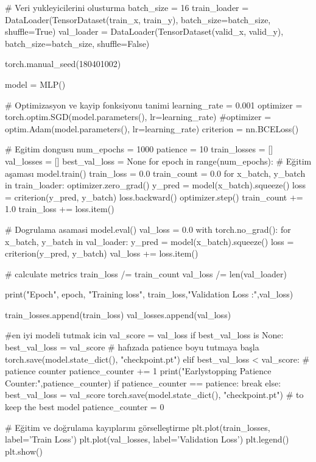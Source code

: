 \documentclass[11pt]{article}
\begin{document}
\begin{python}
# Veri yukleyicilerini olusturma
batch_size = 16
train_loader = DataLoader(TensorDataset(train_x, train_y), batch_size=batch_size, shuffle=True)
val_loader = DataLoader(TensorDataset(valid_x, valid_y), batch_size=batch_size, shuffle=False)

torch.manual_seed(180401002) 

model = MLP()

# Optimizasyon ve kayip fonksiyonu tanimi
learning_rate = 0.001
optimizer = torch.optim.SGD(model.parameters(), lr=learning_rate)
#optimizer = optim.Adam(model.parameters(), lr=learning_rate)
criterion = nn.BCELoss()

# Egitim dongusu
num_epochs = 1000
patience = 10
train_losses = []
val_losses = []
best_val_loss = None
for epoch in range(num_epochs):
    # Eğitim aşaması
    model.train()
    train_loss = 0.0
    train_count = 0.0
    for x_batch, y_batch in train_loader:
        optimizer.zero_grad()
        y_pred = model(x_batch).squeeze()
        loss = criterion(y_pred, y_batch)
        loss.backward()
        optimizer.step()
        train_count += 1.0
        train_loss += loss.item()
    

    # Dogrulama asamasi
    model.eval()
    val_loss = 0.0
    with torch.no_grad():
        for x_batch, y_batch in val_loader:
            y_pred = model(x_batch).squeeze()
            loss = criterion(y_pred, y_batch)
            val_loss += loss.item()
    

    # calculate metrics
    train_loss /= train_count
    val_loss /= len(val_loader)

    print("Epoch", epoch, "Training loss", train_loss,"Validation Loss :",val_loss)

    train_losses.append(train_loss)
    val_losses.append(val_loss)

    #en iyi modeli tutmak icin
    val_score = val_loss
    if best_val_loss is None:
        best_val_loss = val_score # hafızada patience boyu tutmaya başla
        torch.save(model.state_dict(), "checkpoint.pt")
    elif best_val_loss < val_score: # patience counter
        patience_counter += 1
        print("Earlystopping Patience Counter:",patience_counter)
        if patience_counter == patience:
            break
    else:
        best_val_loss = val_score
        torch.save(model.state_dict(), "checkpoint.pt") # to keep the best model
        patience_counter = 0

# Eğitim ve doğrulama kayıplarını görselleştirme
plt.plot(train_losses, label='Train Loss')
plt.plot(val_losses, label='Validation Loss')
plt.legend()
plt.show()
\end{python}
\end{document}
